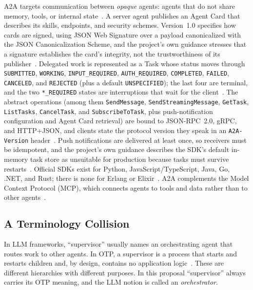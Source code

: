 \documentclass[conference,letterpaper]{IEEEtran}
\newcommand{\code}[1]{\texttt{#1}}
\begin{document}
A2A targets communication between \emph{opaque} agents: agents that do not
share memory, tools, or internal state~\cite{a2a-spec,a2a-github}. A server
agent publishes an Agent Card that describes its skills, endpoints, and
security schemes. Version~1.0 specifies how cards are signed, using JSON Web
Signature over a payload canonicalized with the JSON Canonicalization Scheme,
and the project's own guidance stresses that a signature establishes the
card's integrity, not the trustworthiness of its publisher~\cite{aaif2026}.
Delegated work is represented as a Task whose status moves through
\code{SUBMITTED}, \code{WORKING}, \code{INPUT\_REQUIRED},
\code{AUTH\_REQUIRED}, \code{COMPLETED}, \code{FAILED}, \code{CANCELED}, and
\code{REJECTED} (plus a default \code{UNSPECIFIED}); the last four are
terminal, and the two \code{*\_REQUIRED} states are interruptions that wait
for the client~\cite{a2a-spec}. The abstract operations (among them
\code{SendMessage}, \code{SendStreamingMessage}, \code{GetTask},
\code{ListTasks}, \code{CancelTask}, and \code{SubscribeToTask}, plus
push-notification configuration and Agent Card retrieval) are bound to
JSON-RPC~2.0, gRPC, and HTTP+JSON, and clients state the protocol version
they speak in an \code{A2A-Version} header~\cite{a2a-spec}. Push
notifications are delivered at least once, so receivers must be idempotent,
and the project's own guidance describes the SDK's default in-memory task
store as unsuitable for production because tasks must survive
restarts~\cite{aaif2026}. Official SDKs exist for Python,
JavaScript/TypeScript, Java, Go, .NET, and Rust; there is none for Erlang or
Elixir~\cite{a2a-github}. A2A complements the Model Context Protocol (MCP),
which connects agents to tools and data rather than to other
agents~\cite{lf2026}.

\subsection{A Terminology Collision}

In LLM frameworks, ``supervisor'' usually names an orchestrating agent that
routes work to other agents. In OTP, a supervisor is a process that starts
and restarts children and, by design, contains no application
logic~\cite{otp-sup-princ}. These are different hierarchies with different
purposes. In this proposal ``supervisor'' always carries its OTP meaning,
and the LLM notion is called an \emph{orchestrator}.

\end{document}
